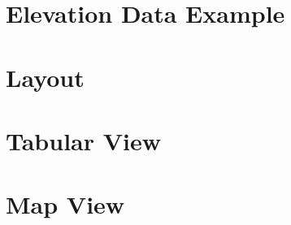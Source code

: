 \documentclass[12pt]{article}
\begin{document}
	\section{Elevation Data Example}
	\section{Layout}
	\section{Tabular View}
	\section{Map View}
\end{document}
